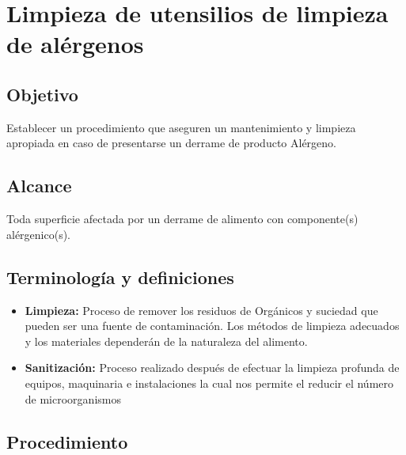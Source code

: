 \thispagestyle{formato-PI}
\renewcommand{\MenorVer}{0}
\renewcommand{\MayorVer}{2}
\renewcommand{\FechaPub}{2023--01}
\renewcommand{\Titulo}{Limpieza de utensilios de limpieza de alérgenos}

\section{\Titulo}
\renewcommand{\Codigo}{\Prog--\thesection--\TipoID}

\subsection{Objetivo}
Establecer un procedimiento que aseguren un mantenimiento y limpieza apropiada en caso de presentarse un derrame de producto Alérgeno.

\subsection{Alcance}
Toda superficie afectada por un derrame de alimento con componente(s) alérgenico(s).

\subsection{Terminología y definiciones}
\begin{itemize}
	\item \textbf{Limpieza:} Proceso de remover los residuos de Orgánicos y suciedad que pueden ser una fuente de contaminación. Los métodos de limpieza adecuados y los materiales dependerán de la naturaleza del alimento.
	\item \textbf{Sanitización:} Proceso realizado después de efectuar la limpieza profunda de equipos, maquinaria e instalaciones la cual nos permite el reducir el número de microorganismos
\end{itemize}
\subsection{Procedimiento}
